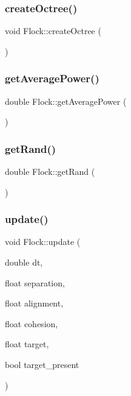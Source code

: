 \subsubsection{\texorpdfstring{create\+Octree()}{createOctree()}}
{\footnotesize\ttfamily void Flock\+::create\+Octree (\begin{DoxyParamCaption}{ }\end{DoxyParamCaption})}

\mbox{\label{classFlock_a65ae41c2c0eaaab0498c5a091d63a776}} 
\subsubsection{\texorpdfstring{get\+Average\+Power()}{getAveragePower()}}
{\footnotesize\ttfamily double Flock\+::get\+Average\+Power (\begin{DoxyParamCaption}{ }\end{DoxyParamCaption})}

\mbox{\label{classFlock_a9c91990979a1d4cab91c5abd1d3ac983}} 
\subsubsection{\texorpdfstring{get\+Rand()}{getRand()}}
{\footnotesize\ttfamily double Flock\+::get\+Rand (\begin{DoxyParamCaption}{ }\end{DoxyParamCaption})}

\mbox{\label{classFlock_aba009392cab937cd3911278a56c12bfc}} 
\subsubsection{\texorpdfstring{update()}{update()}}
{\footnotesize\ttfamily void Flock\+::update (\begin{DoxyParamCaption}\item[{double}]{dt,  }\item[{float}]{separation,  }\item[{float}]{alignment,  }\item[{float}]{cohesion,  }\item[{float}]{target,  }\item[{bool}]{target\+\_\+present }\end{DoxyParamCaption})}

